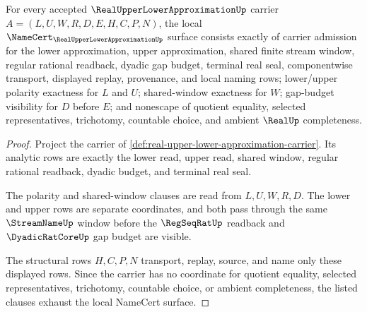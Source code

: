 \begin{theorem}
\label{thm:real-upper-lower-approximation-namecert-obligations}
For every accepted $\RealUpperLowerApproximationUp$ carrier $A=(L,U,W,R,D,E,H,C,P,N)$, the local $\NameCert_{\RealUpperLowerApproximationUp}$ surface consists exactly of carrier admission for the lower approximation, upper approximation, shared finite stream window, regular rational readback, dyadic gap budget, terminal real seal, componentwise transport, displayed replay, provenance, and local naming rows; lower/upper polarity exactness for $L$ and $U$; shared-window exactness for $W$; gap-budget visibility for $D$ before $E$; and nonescape of quotient equality, selected representatives, trichotomy, countable choice, and ambient $\RealUp$ completeness.
\end{theorem}
\begin{proof}
Project the carrier of \autoref{def:real-upper-lower-approximation-carrier}. Its analytic rows are exactly the lower read, upper read, shared window, regular rational readback, dyadic budget, and terminal real seal.

The polarity and shared-window clauses are read from $L,U,W,R,D$. The lower and upper rows are separate coordinates, and both pass through the same $\StreamNameUp$ window before the $\RegSeqRatUp$ readback and $\DyadicRatCoreUp$ gap budget are visible.

The structural rows $H,C,P,N$ transport, replay, source, and name only these displayed rows. Since the carrier has no coordinate for quotient equality, selected representatives, trichotomy, countable choice, or ambient completeness, the listed clauses exhaust the local NameCert surface.
\end{proof}

